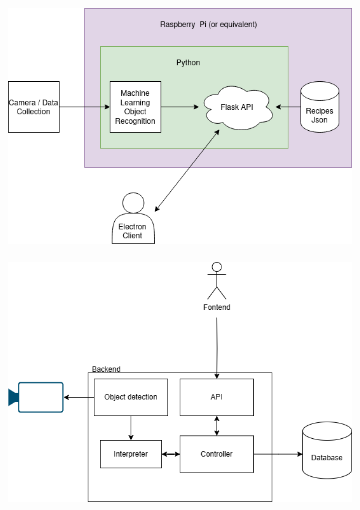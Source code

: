\documentclass{article}
\begin{document}
    \begin{figure}[t]
      \centering
      \begin{subfigure}{0.45\linewidth}
        \includegraphics[width=\linewidth]{assets/first-architecture.png}
        \caption{}
        \label{fig:architectureA}
      \end{subfigure}
      \hfill
      \begin{subfigure}{0.45\linewidth}
        \includegraphics[width=\linewidth]{assets/second-architecture.png}
        \caption{}
        \label{fig:architectureB}
      \end{subfigure}
      \vfill
      \begin{subfigure}{0.5\linewidth}

\end{subfigure}
\end{figure}
\end{document}
